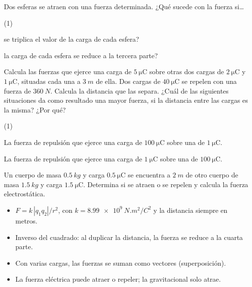 \documentclass[11pt]{article}
\begin{document}
\begin{preguntas}
\pregunta Dos esferas se atraen con una fuerza determinada. ¿Qué sucede con la
fuerza si\ldots
\begin{opciones*}(1)
  \item se triplica el valor de la carga de cada esfera?
  \item la carga de cada esfera se reduce a la tercera parte?
\end{opciones*}
\espacio{2.5cm}
\pregunta Calcula las fuerzas que ejerce una carga de
$\qty{5}{\micro\coulomb}$ sobre otras dos cargas de $\qty{2}{\micro\coulomb}$
y $\qty{1}{\micro\coulomb}$, situadas cada una a $\qty{3}{m}$ de ella.
\espacio{2.5cm}
\pregunta Dos cargas de $\qty{40}{\micro\coulomb}$ se repelen con una fuerza
de $\qty{360}{N}$. Calcula la distancia que las separa.
\espacio{2.5cm}
\pregunta ¿Cuál de las siguientes situaciones da como resultado una mayor
fuerza, si la distancia entre las cargas es la misma? ¿Por qué?
\begin{opciones*}(1)
  \item La fuerza de repulsión que ejerce una carga de
        $\qty{100}{\micro\coulomb}$ sobre una de $\qty{1}{\micro\coulomb}$.
  \item La fuerza de repulsión que ejerce una carga de
        $\qty{1}{\micro\coulomb}$ sobre una de $\qty{100}{\micro\coulomb}$.
\end{opciones*}
\espacio{2.5cm}
\pregunta Un cuerpo de masa $\qty{0,5}{kg}$ y carga
$\qty{0,5}{\micro\coulomb}$ se encuentra a $\qty{2}{m}$ de otro cuerpo de masa
$\qty{1,5}{kg}$ y carga $\qty{1,5}{\micro\coulomb}$. Determina si se atraen o
se repelen y calcula la fuerza electrostática.
\espacio{3cm}
\end{preguntas}

\begin{resumen}
\begin{itemize}
  \item $F = k\,|q_1q_2|/r^{2}$, con $k = \qty{8,99e9}{N.m^2/C^2}$ y la
        distancia siempre en metros.
  \item Inverso del cuadrado: al duplicar la distancia, la fuerza se reduce a
        la cuarta parte.
  \item Con varias cargas, las fuerzas se suman como vectores (superposición).
  \item La fuerza eléctrica puede atraer o repeler; la gravitacional solo atrae.
\end{itemize}
\end{resumen}
\end{document}
